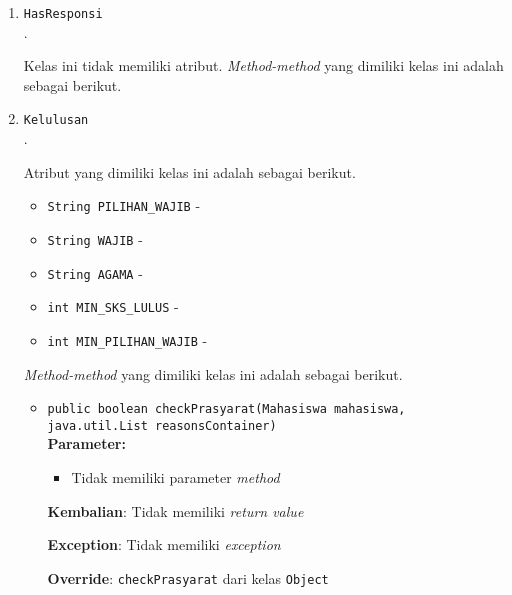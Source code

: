 \documentclass{article}
\begin{document}
\begin{enumerate}
\begin{itemize}
\end{itemize}
\item \texttt{HasResponsi}\\ 
.

Kelas ini tidak memiliki atribut. \textit{Method-method} yang dimiliki kelas ini adalah sebagai berikut.
\begin{itemize}
\end{itemize}
\item \texttt{Kelulusan}\\ 
.

Atribut yang dimiliki kelas ini adalah sebagai berikut.
\begin{itemize}
\item \texttt{String PILIHAN_WAJIB} - 
\item \texttt{String WAJIB} - 
\item \texttt{String AGAMA} - 
\item \texttt{int MIN_SKS_LULUS} - 
\item \texttt{int MIN_PILIHAN_WAJIB} - 
\end{itemize}
\textit{Method-method} yang dimiliki kelas ini adalah sebagai berikut.
\begin{itemize}
\item \texttt{public boolean checkPrasyarat(Mahasiswa mahasiswa, java.util.List reasonsContainer)}\\ 


\textbf{Parameter:}\begin{itemize}
\item Tidak memiliki parameter \textit{method}
\end{itemize}
\textbf{Kembalian}: Tidak memiliki \textit{return value}

\textbf{Exception}: Tidak memiliki \textit{exception}

\textbf{Override}: \texttt{checkPrasyarat} dari kelas \texttt{Object}

\end{itemize}
\end{enumerate}
\end{document}
